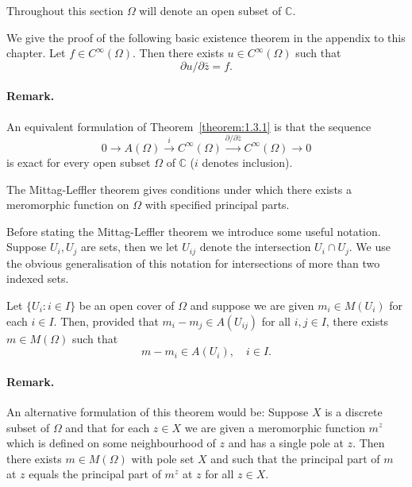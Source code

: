 Throughout this section $\Omega$ will denote an open subset of $\mathbb C$.

We give the proof of the following basic existence theorem in the appendix to this chapter.
 Let $f\in C^\infty(\Omega)$. Then there exists $u\in C^\infty(\Omega)$ such that
\[ \partial u/\partial\bar z=f. \]
\paragraph*{Remark.} An equivalent formulation of Theorem~\ref{theorem:1.3.1} is that the sequence
\[ 0\longrightarrow A(\Omega)\xrightarrow{i}C^\infty(\Omega)\xrightarrow{\partial/\partial\bar z}C^\infty(\Omega)\longrightarrow0 \]
is exact for every open subset $\Omega$ of $\mathbb C$ ($i$ denotes inclusion).

The Mittag-Leffler theorem gives conditions under which there exists a meromorphic function on $\Omega$ with specified principal parts.

Before stating the Mittag-Leffler theorem we introduce some useful notation. Suppose $U_i,U_j$ are sets, then we let $U_{ij}$ denote the intersection $U_i\cap U_j$. We use the obvious generalisation of this notation for intersections of more than two indexed sets.

 Let $\{U_i:i\in I\}$ be an open cover of $\Omega$ and suppose we are given $m_i\in M(U_i)$ for each $i\in I$. Then, provided that $m_i-m_j\in A(U_{ij})$ for all $i,j\in I$, there exists $m\in M(\Omega)$ such that
\[ m-m_i\in A(U_i),\quad i\in I. \]
\paragraph*{Remark.} An alternative formulation of this theorem would be: Suppose $X$ is a discrete subset of $\Omega$ and that for each $z\in X$ we are given a meromorphic function $m^z$ which is defined on some neighbourhood of $z$ and has a single pole at $z$. Then there exists $m\in M(\Omega)$ with pole set $X$ and such that the principal part of $m$ at $z$ equals the principal part of $m^z$ at $z$ for all $z\in X$.

